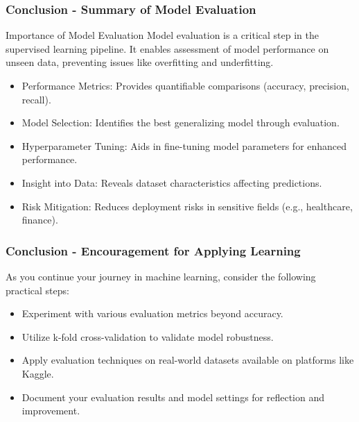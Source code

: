 \documentclass[aspectratio=169]{beamer}
\begin{document}
\begin{frame}[fragile]
    \frametitle{Conclusion - Summary of Model Evaluation}
    \begin{block}{Importance of Model Evaluation}
        Model evaluation is a critical step in the supervised learning pipeline. It enables assessment of model performance on unseen data, preventing issues like overfitting and underfitting.
    \end{block}
    
    \begin{itemize}
        \item Performance Metrics: Provides quantifiable comparisons (accuracy, precision, recall).
        \item Model Selection: Identifies the best generalizing model through evaluation.
        \item Hyperparameter Tuning: Aids in fine-tuning model parameters for enhanced performance.
        \item Insight into Data: Reveals dataset characteristics affecting predictions.
        \item Risk Mitigation: Reduces deployment risks in sensitive fields (e.g., healthcare, finance).
    \end{itemize}
\end{frame}

\begin{frame}[fragile]
    \frametitle{Conclusion - Encouragement for Applying Learning}
    As you continue your journey in machine learning, consider the following practical steps:

    \begin{itemize}
        \item Experiment with various evaluation metrics beyond accuracy.
        \item Utilize k-fold cross-validation to validate model robustness.
        \item Apply evaluation techniques on real-world datasets available on platforms like Kaggle.
        \item Document your evaluation results and model settings for reflection and improvement.
    \end{itemize}
\end{frame}
\end{document}

